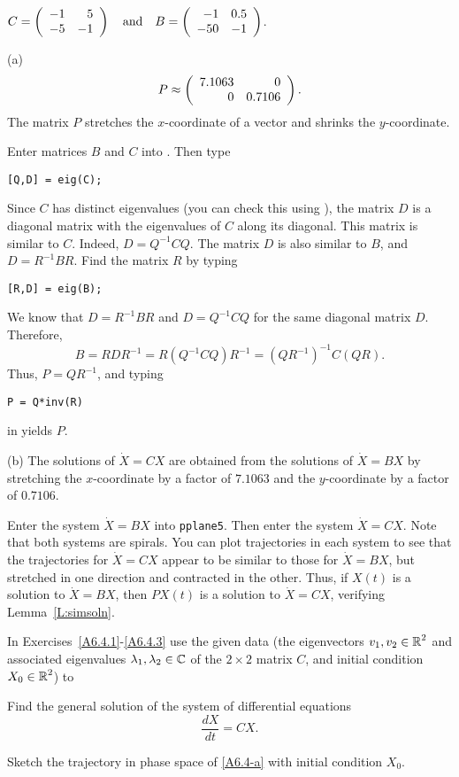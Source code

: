 \documentclass{ximera}
\begin{document}
\begin{exercise} \label{E:simb}
$C = \left(\begin{array}{rr} -1 & 5\\ -5 &-1\end{array}\right) \quad\mbox{and}\quad B = \left(\begin{array}{rr} -1 & 0.5\\ -50 &-1\end{array}\right)$.

\begin{solution}

(a) \ans
\[
P \approx \left(\begin{array}{rr} 7.1063 & 0\\ 0 &0.7106\end{array}\right).
\]
The matrix $P$ stretches the $x$-coordinate of a vector and shrinks the
$y$-coordinate.

\soln Enter matrices $B$ and $C$ into \Matlabp.  Then type
\begin{verbatim}
[Q,D] = eig(C);
\end{verbatim}
Since $C$ has distinct eigenvalues (you can check this using
\Matlabp), the matrix $D$ is a diagonal matrix with the eigenvalues of
$C$ along its diagonal.  This matrix is similar to $C$.  Indeed, $D =
Q^{-1}CQ$.  The matrix $D$ is also similar to $B$, and $D= R^{-1}BR$.
Find the matrix $R$ by typing
\begin{verbatim}
[R,D] = eig(B);
\end{verbatim}
We know that $D = R^{-1}BR$ and $D = Q^{-1}CQ$ for the same diagonal
matrix $D$.  Therefore,
\[
B = RDR^{-1} = R(Q^{-1}CQ)R^{-1} = (QR^{-1})^{-1}C(QR).
\]
Thus, $P = QR^{-1}$, and typing
\begin{verbatim}
P = Q*inv(R)
\end{verbatim}
in \Matlab yields $P$.

(b) \ans The solutions of $\dot{X} = CX$ are obtained from the solutions
of $\dot{X} = BX$ by stretching the $x$-coordinate by a factor of $7.1063$
and the $y$-coordinate by a factor of $0.7106$.

\soln Enter the system $\dot{X} = BX$ into {\tt pplane5}.  Then enter the
system $\dot{X} = CX$.  Note that both systems are spirals.  You can
plot trajectories in each system to see that the trajectories for
$\dot{X} = CX$ appear to be similar to those for $\dot{X} = BX$, but
stretched in one direction and contracted in the other.  Thus, if
$X(t)$ is a solution to $\dot{X} = BX$, then $PX(t)$ is a solution to
$\dot{X} = CX$, verifying Lemma~\ref{L:simsoln}.

\end{solution}
\end{exercise}

\AEXER


In Exercises~\ref{A6.4.1}-\ref{A6.4.3} use the given data (the eigenvectors 
$v_1,v_2\in\mbox{$\Bbb{R}$}^2$ and associated eigenvalues $\lambda_1,\lambda_2\in\mbox{$\Bbb{C}$}$
of the $2\times 2$ matrix $C$, and initial condition $X_0\in\mbox{$\Bbb{R}$}^2$) to   
\begin{enumeratea}
\item Find the general solution of the system of differential equations 
\begin{equation} \label{A6.4-a}
\frac{dX}{dt} = CX. 
\end{equation}
\item Sketch the trajectory in phase space of \eqref{A6.4-a} with initial condition $X_0$.
\end{enumeratea}
\end{document}
